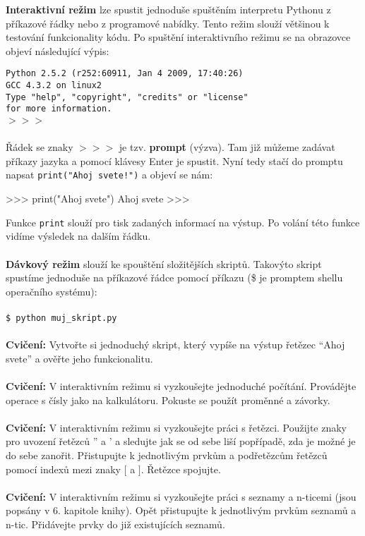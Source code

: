 {\textbf{Interaktivní režim}} lze spustit jednoduše spuštěním interpretu Pythonu z příkazové řádky nebo z programové nabídky. Tento režim slouží většinou k testování funkcionality kódu. Po spuštění interaktivního režimu se na obrazovce objeví následující výpis:

\newpage
\noindent
{\texttt{Python 2.5.2 (r252:60911, Jan  4 2009, 17:40:26) \\
GCC 4.3.2 on linux2\\
Type "help", "copyright", "credits" or "license"\\
for more information.\\
$>>>$
}}
\\
\\
\noindent
Řádek se znaky {\texttt{$>>>$}} je tzv. \textbf{prompt} (výzva). Tam již můžeme zadávat příkazy jazyka a pomocí klávesy Enter je spustit.
Nyní tedy stačí do promptu napsat {\texttt{print("Ahoj svete!")}} a objeví se nám:

\begin{python}
>>> print("Ahoj svete")
Ahoj svete
>>> 
\end{python}

\noindent
Funkce {\texttt{print}} slouží pro tisk zadaných informací na výstup. Po volání této funkce vidíme výsledek na dalším řádku.
\\
\\
\noindent
{\textbf{Dávkový režim}} slouží ke spouštění složitějších skriptů. Takovýto skript spustíme jednoduše na příkazové řádce pomocí příkazu (\$ je promptem shellu operačního systému):
\\
\\
\noindent
{\texttt{\$ python muj\_skript.py}}
\\
\\
\noindent
{\textbf{Cvičení:}}
Vytvořte si jednoduchý skript, který vypíše na výstup řetězec ``Ahoj svete'' a ověřte jeho funkcionalitu.
\\
\\
\noindent
{\textbf{Cvičení:}}
V interaktivním režimu si vyzkoušejte jednoduché počítání. Provádějte operace s čísly jako na kalkulátoru. Pokuste se použít proměnné a závorky.
\\
\\
\noindent
{\textbf{Cvičení:}}
V interaktivním režimu si vyzkoušejte práci s řetězci. Použijte znaky pro uvození řetězců '' a ' a sledujte jak se od sebe liší popřípadě, zda je možné je do sebe zanořit. Přistupujte k jednotlivým prvkům a podřetězcům řetězců pomocí indexů mezi znaky $[$ a $]$. Řetězce spojujte.
\\
\\
\noindent
{\textbf{Cvičení:}}
V interaktivním režimu si vyzkoušejte práci s seznamy a n-ticemi (jsou popsány v 6. kapitole knihy). Opět přistupujte k jednotlivým prvkům seznamů a n-tic. Přidávejte prvky do již existujících seznamů.

